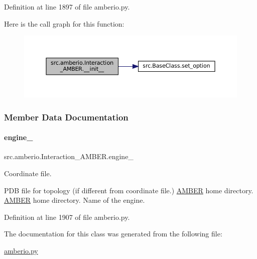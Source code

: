 Definition at line 1897 of file amberio.\+py.

Here is the call graph for this function\+:
\nopagebreak
\begin{figure}[H]
\begin{center}
\leavevmode
\includegraphics[width=350pt]{classsrc_1_1amberio_1_1Interaction__AMBER_ac1a0d7241be581712feee70194515f0b_cgraph}
\end{center}
\end{figure}


\subsubsection{Member Data Documentation}
\mbox{\label{classsrc_1_1amberio_1_1Interaction__AMBER_a4fc0bf1dde7b006b07dbb0f09efb297f}} 
\paragraph{\texorpdfstring{engine\+\_\+}{engine\_}}
{\footnotesize\ttfamily src.\+amberio.\+Interaction\+\_\+\+A\+M\+B\+E\+R.\+engine\+\_\+}



Coordinate file. 

P\+DB file for topology (if different from coordinate file.) \hyperlink{classsrc_1_1amberio_1_1AMBER}{A\+M\+B\+ER} home directory. \hyperlink{classsrc_1_1amberio_1_1AMBER}{A\+M\+B\+ER} home directory. Name of the engine. 

Definition at line 1907 of file amberio.\+py.



The documentation for this class was generated from the following file\+:\begin{DoxyCompactItemize}
\item 
\hyperlink{amberio_8py}{amberio.\+py}\end{DoxyCompactItemize}
